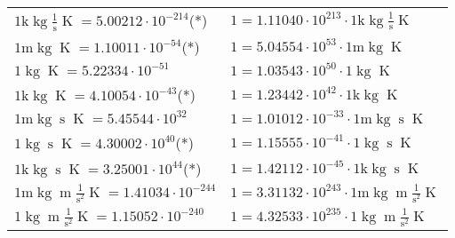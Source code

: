 \begin{center}
\begin{longtable}{l l}
{\color{gray}$1 \bm{\mathrm{ k}}\operatorname{kg}{}\frac1{\operatorname{s}}{}{\operatorname{K}} = 5.00212\cdot10^{-214} $}\quad(*) & {\color{gray}$ 1 = 1.11040\cdot10^{213} \cdot 1 \bm{\mathrm{ k}}\operatorname{kg}{}\frac1{\operatorname{s}}{}{\operatorname{K}}$}  \\
{\color{gray}$1 \bm{\mathrm{ m}}\operatorname{kg}{}{}{}{\operatorname{K}} = 1.10011\cdot10^{-54} $}\quad(*) & {\color{gray}$ 1 = 5.04554\cdot10^{53} \cdot 1 \bm{\mathrm{ m}}\operatorname{kg}{}{}{}{\operatorname{K}}$}  \\
{\color{black}$1 \bm{\mathrm{ }}\operatorname{kg}{}{}{}{\operatorname{K}} = 5.22334\cdot10^{-51} $}   & {\color{black}$ 1 = 1.03543\cdot10^{50} \cdot 1 \bm{\mathrm{ }}\operatorname{kg}{}{}{}{\operatorname{K}}$}  \\
{\color{gray}$1 \bm{\mathrm{ k}}\operatorname{kg}{}{}{}{\operatorname{K}} = 4.10054\cdot10^{-43} $}\quad(*) & {\color{gray}$ 1 = 1.23442\cdot10^{42} \cdot 1 \bm{\mathrm{ k}}\operatorname{kg}{}{}{}{\operatorname{K}}$}  \\
{\color{gray}$1 \bm{\mathrm{ m}}\operatorname{kg}{}{\operatorname{s}}{}{\operatorname{K}} = 5.45544\cdot10^{32} $}   & {\color{gray}$ 1 = 1.01012\cdot10^{-33} \cdot 1 \bm{\mathrm{ m}}\operatorname{kg}{}{\operatorname{s}}{}{\operatorname{K}}$}  \\
{\color{black}$1 \bm{\mathrm{ }}\operatorname{kg}{}{\operatorname{s}}{}{\operatorname{K}} = 4.30002\cdot10^{40} $}\quad(*) & {\color{black}$ 1 = 1.15555\cdot10^{-41} \cdot 1 \bm{\mathrm{ }}\operatorname{kg}{}{\operatorname{s}}{}{\operatorname{K}}$}  \\
{\color{gray}$1 \bm{\mathrm{ k}}\operatorname{kg}{}{\operatorname{s}}{}{\operatorname{K}} = 3.25001\cdot10^{44} $}\quad(*) & {\color{gray}$ 1 = 1.42112\cdot10^{-45} \cdot 1 \bm{\mathrm{ k}}\operatorname{kg}{}{\operatorname{s}}{}{\operatorname{K}}$}  \\
{\color{gray}$1 \bm{\mathrm{ m}}\operatorname{kg}{\operatorname{m}}\frac1{\operatorname{s}^2}{}{\operatorname{K}} = 1.41034\cdot10^{-244} $}   & {\color{gray}$ 1 = 3.31132\cdot10^{243} \cdot 1 \bm{\mathrm{ m}}\operatorname{kg}{\operatorname{m}}\frac1{\operatorname{s}^2}{}{\operatorname{K}}$}  \\
{\color{black}$1 \bm{\mathrm{ }}\operatorname{kg}{\operatorname{m}}\frac1{\operatorname{s}^2}{}{\operatorname{K}} = 1.15052\cdot10^{-240} $}   & {\color{black}$ 1 = 4.32533\cdot10^{235} \cdot 1 \bm{\mathrm{ }}\operatorname{kg}{\operatorname{m}}\frac1{\operatorname{s}^2}{}{\operatorname{K}}$}  \\

\end{longtable}
\end{center}
